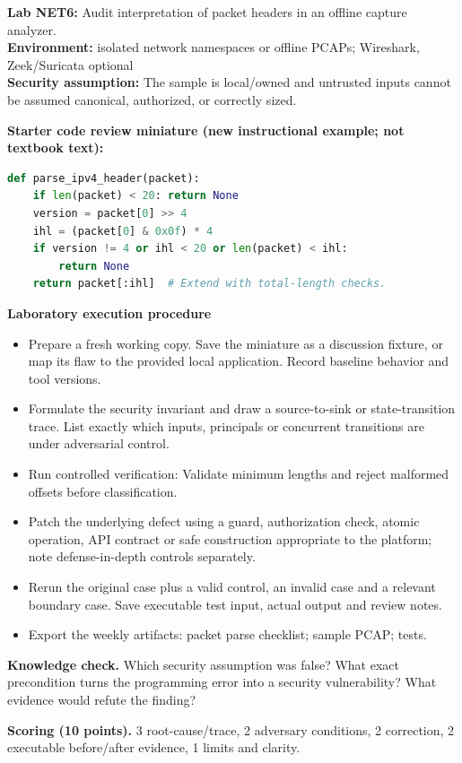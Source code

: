 \documentclass[10pt,letterpaper]{article}
\begin{document}
\begin{insight}\textbf{Lab NET6:} Audit interpretation of packet headers in an offline capture analyzer.\\\textbf{Environment:} isolated network namespaces or offline PCAPs; Wireshark, Zeek/Suricata optional\\\textbf{Security assumption:} The sample is local/owned and untrusted inputs cannot be assumed canonical, authorized, or correctly sized.\end{insight}
\textbf{Starter code review miniature (new instructional example; not textbook text):}
\begin{lstlisting}[language=Python]
def parse_ipv4_header(packet):
    if len(packet) < 20: return None
    version = packet[0] >> 4
    ihl = (packet[0] & 0x0f) * 4
    if version != 4 or ihl < 20 or len(packet) < ihl:
        return None
    return packet[:ihl]  # Extend with total-length checks.
\end{lstlisting}
\textbf{Laboratory execution procedure}
\begin{itemize}[leftmargin=*,itemsep=2pt]
\item Prepare a fresh working copy. Save the miniature as a discussion fixture, or map its flaw to the provided local application. Record baseline behavior and tool versions.
\item Formulate the security invariant and draw a source-to-sink or state-transition trace. List exactly which inputs, principals or concurrent transitions are under adversarial control.
\item Run controlled verification: Validate minimum lengths and reject malformed offsets before classification.
\item Patch the underlying defect using a guard, authorization check, atomic operation, API contract or safe construction appropriate to the platform; note defense-in-depth controls separately.
\item Rerun the original case plus a valid control, an invalid case and a relevant boundary case. Save executable test input, actual output and review notes.
\item Export the weekly artifacts: packet parse checklist; sample PCAP; tests.
\end{itemize}
\textbf{Knowledge check.} Which security assumption was false? What exact precondition turns the programming error into a security vulnerability? What evidence would refute the finding?

\textbf{Scoring (10 points).} 3 root-cause/trace, 2 adversary conditions, 2 correction, 2 executable before/after evidence, 1 limits and clarity.
\end{document}
